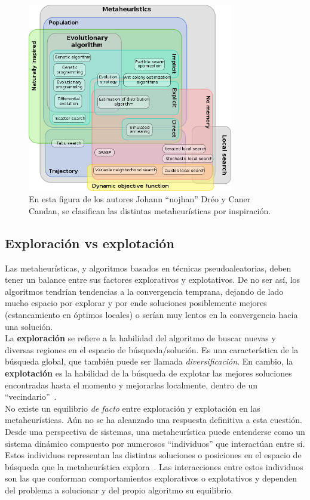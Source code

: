 \begin{figure}[htp]
    \begin{center}
        \includegraphics[width=0.8\textwidth]{imagenes/mh_euler_graph.png}
    \end{center}
    \caption[Clasificación metaheurísticas]{En esta figura de los autores Johann ``nojhan'' Dréo y Caner Candan, se clasifican las distintas metaheurísticas por inspiración.}
\end{figure}

\subsection{Exploración vs explotación}
Las metaheurísticas, y algoritmos basados en técnicas pseudoaleatorias, deben tener un balance entre sus factores explorativos y explotativos. De no ser así, los algoritmos tendrían tendencias a la convergencia temprana, dejando de lado mucho espacio por explorar y por ende soluciones posiblemente mejores (estancamiento en óptimos locales) o serían muy lentos en la convergencia hacia una solución.\\[6pt]
La \textbf{exploración} se refiere a la habilidad del algoritmo de buscar nuevas y diversas regiones en el espacio de búsqueda/solución. Es una característica de la búsqueda global, que también puede ser llamada \textit{diversificación}. En cambio, la \textbf{explotación} es la habilidad de la búsqueda de explotar las mejores soluciones encontradas hasta el momento y mejorarlas localmente, dentro de un ``vecindario''~\cite{xu2014exploration}.\\[6pt]
No existe un equilibrio \textit{de facto} entre exploración y explotación en las metaheurísticas. Aún no se ha alcanzado una respuesta definitiva a esta cuestión. Desde una perspectiva de sistemas, una metaheurística puede entenderse como un sistema dinámico compuesto por numerosos ``individuos'' que interactúan entre sí. Estos individuos representan las distintas soluciones o posiciones en el espacio de búsqueda que la metaheurística explora~\cite{6896450}. Las interacciones entre estos individuos son las que conforman comportamientos explorativos o explotativos y dependen del problema a solucionar y del propio algoritmo su equilibrio.

